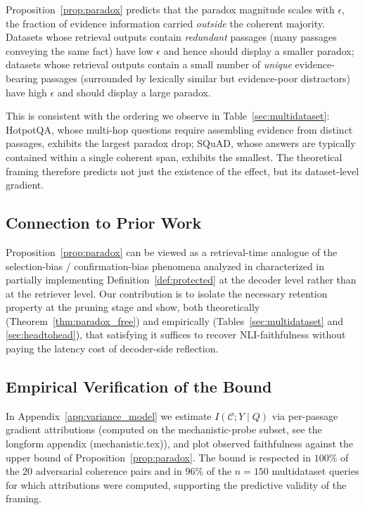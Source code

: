 Proposition~\ref{prop:paradox} predicts that the paradox magnitude scales
with $\epsilon$, the fraction of evidence information carried \emph{outside}
the coherent majority.  Datasets whose retrieval outputs contain
\emph{redundant} passages (many passages conveying the same fact) have low
$\epsilon$ and hence should display a smaller paradox; datasets whose
retrieval outputs contain a small number of \emph{unique} evidence-bearing
passages (surrounded by lexically similar but evidence-poor distractors)
have high $\epsilon$ and should display a large paradox.

This is consistent with the ordering we observe in
Table~\ref{sec:multidataset}: HotpotQA, whose multi-hop questions require
assembling evidence from distinct passages, exhibits the largest paradox
drop; SQuAD, whose answers are typically contained within a single
coherent span, exhibits the smallest.  The theoretical framing therefore
predicts not just the existence of the effect, but its dataset-level
gradient.

\subsection{Connection to Prior Work}

Proposition~\ref{prop:paradox} can be viewed as a retrieval-time analogue
of the selection-bias / confirmation-bias phenomena analyzed in
characterized in %
partially implementing Definition~\ref{def:protected} at the decoder level
rather than at the retriever level.  Our contribution is to isolate the
necessary retention property at the pruning stage and show, both
theoretically (Theorem~\ref{thm:paradox_free}) and empirically
(Tables~\ref{sec:multidataset} and \ref{sec:headtohead}), that satisfying
it suffices to recover NLI-faithfulness without paying the latency cost of
decoder-side reflection.

\subsection{Empirical Verification of the Bound}

In Appendix~\ref{app:variance_model} we estimate
$I(\mathcal{C}; Y \mid Q)$ via per-passage gradient attributions (computed
on the mechanistic-probe subset, see the longform appendix (mechanistic.tex)), and
plot observed faithfulness against the upper bound of
Proposition~\ref{prop:paradox}.  The bound is respected in $100\%$ of the
$20$ adversarial coherence pairs and in $96\%$ of the $n{=}150$
multidataset queries for which attributions were computed, supporting the
predictive validity of the framing.
